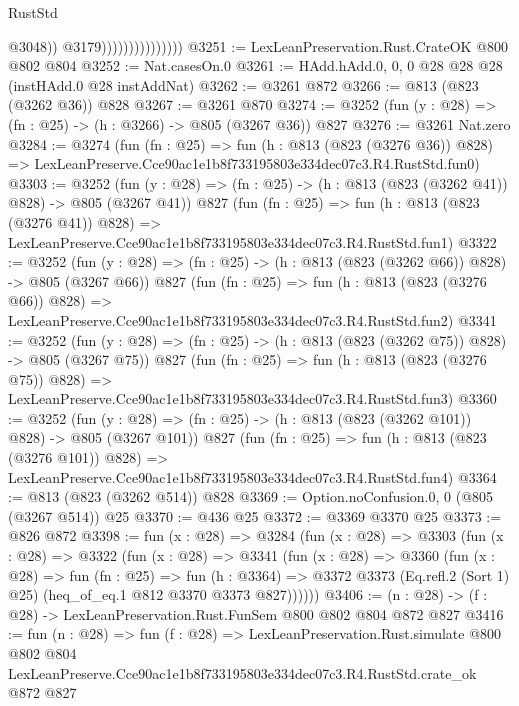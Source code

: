 \begin{lexlean}{RustStd}
\begin{coremodule}
                                      @3048))
                                  @3179)))))))))))))))
@3251 := LexLeanPreservation.Rust.CrateOK @800 @802 @804
@3252 := Nat.casesOn.{0}
@3261 := HAdd.hAdd.{0, 0, 0} @28 @28 @28 (instHAdd.{0} @28 instAddNat)
@3262 := @3261 @872
@3266 := @813 (@823 (@3262 @36)) @828
@3267 := @3261 @870
@3274 := @3252 (fun (y : @28) => (fn : @25) -> (h : @3266) -> @805 (@3267 @36)) @827
@3276 := @3261 Nat.zero
@3284 := @3274
    (fun (fn : @25) =>
    fun (h : @813 (@823 (@3276 @36)) @828) =>
    LexLeanPreserve.Cce90ac1e1b8f733195803e334dec07c3.R4.RustStd.fun0)
@3303 := @3252
    (fun (y : @28) => (fn : @25) -> (h : @813 (@823 (@3262 @41)) @828) -> @805 (@3267 @41))
    @827
    (fun (fn : @25) =>
    fun (h : @813 (@823 (@3276 @41)) @828) =>
    LexLeanPreserve.Cce90ac1e1b8f733195803e334dec07c3.R4.RustStd.fun1)
@3322 := @3252
    (fun (y : @28) => (fn : @25) -> (h : @813 (@823 (@3262 @66)) @828) -> @805 (@3267 @66))
    @827
    (fun (fn : @25) =>
    fun (h : @813 (@823 (@3276 @66)) @828) =>
    LexLeanPreserve.Cce90ac1e1b8f733195803e334dec07c3.R4.RustStd.fun2)
@3341 := @3252
    (fun (y : @28) => (fn : @25) -> (h : @813 (@823 (@3262 @75)) @828) -> @805 (@3267 @75))
    @827
    (fun (fn : @25) =>
    fun (h : @813 (@823 (@3276 @75)) @828) =>
    LexLeanPreserve.Cce90ac1e1b8f733195803e334dec07c3.R4.RustStd.fun3)
@3360 := @3252
    (fun (y : @28) => (fn : @25) -> (h : @813 (@823 (@3262 @101)) @828) -> @805 (@3267 @101))
    @827
    (fun (fn : @25) =>
    fun (h : @813 (@823 (@3276 @101)) @828) =>
    LexLeanPreserve.Cce90ac1e1b8f733195803e334dec07c3.R4.RustStd.fun4)
@3364 := @813 (@823 (@3262 @514)) @828
@3369 := Option.noConfusion.{0, 0} (@805 (@3267 @514)) @25
@3370 := @436 @25
@3372 := @3369 @3370 @25
@3373 := @826 @872
@3398 := fun (x : @28) =>
  @3284
    (fun (x : @28) =>
    @3303
      (fun (x : @28) =>
      @3322
        (fun (x : @28) =>
        @3341
          (fun (x : @28) =>
          @3360
            (fun (x : @28) =>
            fun (fn : @25) =>
            fun (h : @3364) =>
            @3372 @3373 (Eq.refl.{2} (Sort 1) @25) (heq_of_eq.{1} @812 @3370 @3373 @827))))))
@3406 := (n : @28) -> (f : @28) -> LexLeanPreservation.Rust.FunSem @800 @802 @804 @872 @827
@3416 := fun (n : @28) =>
  fun (f : @28) =>
  LexLeanPreservation.Rust.simulate
    @800
    @802
    @804
    LexLeanPreserve.Cce90ac1e1b8f733195803e334dec07c3.R4.RustStd.crate_ok
    @872
    @827
\end{coremodule}
\end{lexlean}
